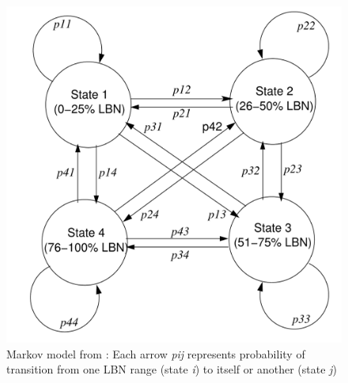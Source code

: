 
\begin{figure}[t]
	\centering
	\includegraphics[scale=0.4]{presyn-figures/storagecharacterization.pdf}
	\caption{Markov model from \cite{storagecharacterization}: 
		Each arrow \textit{pij} represents probability of transition from one LBN 
			range (state \textit{i}) to itself or another (state \textit{j})}
	\label{fig:storagecharacterization}
\end{figure}


